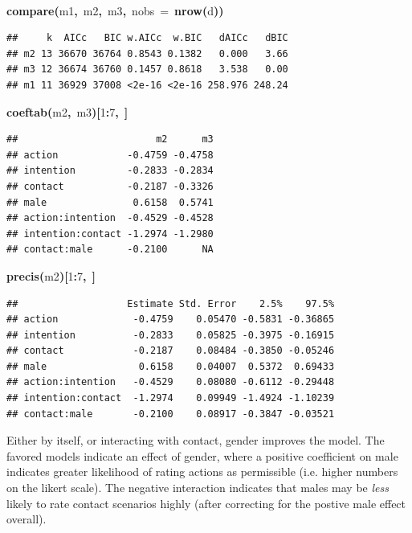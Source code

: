 \documentclass{article}
\makeatletter
\newcommand{\hlnumber}[1]{\textcolor[rgb]{0,0,0}{#1}}%
\newcommand{\hlfunctioncall}[1]{\textcolor[rgb]{.5,0,.33}{\textbf{#1}}}%
\newcommand{\hlkeyword}[1]{\textbf{#1}}%
\newcommand{\hlargument}[1]{\textcolor[rgb]{.69,.25,.02}{#1}}%
\newcommand{\hlsymbol}[1]{#1}%
\newcommand{\hlstd}[1]{\textcolor[rgb]{0,0,0}{#1}}%
\newenvironment{kframe}{%
 \def\FrameCommand##1{\hskip\@totalleftmargin \hskip-\fboxsep
 \colorbox{shadecolor}{##1}\hskip-\fboxsep
     \hskip-\linewidth \hskip-\@totalleftmargin \hskip\columnwidth}%
 \MakeFramed {\advance\hsize-\width
   \@totalleftmargin\z@ \linewidth\hsize
   \@setminipage}}%
 {\par\unskip\endMakeFramed}
\newenvironment{knitrout}{}{} %
\makeatother
\begin{document}
\begin{knitrout}
{\begin{kframe}
\begin{flushleft}
\hlstd{}\hspace*{\fill}\\
\hlstd{}\hlfunctioncall{compare}\hlkeyword{(}\hlsymbol{m1}\hlkeyword{,}{\ }\hlsymbol{m2}\hlkeyword{,}{\ }\hlsymbol{m3}\hlkeyword{,}{\ }\hlargument{nobs}{\ }\hlargument{=}{\ }\hlfunctioncall{nrow}\hlkeyword{(}\hlsymbol{d}\hlkeyword{)}\hlkeyword{)}\mbox{}
\normalfont
\end{flushleft}
\begin{verbatim}
##     k  AICc   BIC w.AICc  w.BIC   dAICc   dBIC
## m2 13 36670 36764 0.8543 0.1382   0.000   3.66
## m3 12 36674 36760 0.1457 0.8618   3.538   0.00
## m1 11 36929 37008 <2e-16 <2e-16 258.976 248.24
\end{verbatim}
\begin{flushleft}
\ttfamily\noindent
\hlfunctioncall{coeftab}\hlkeyword{(}\hlsymbol{m2}\hlkeyword{,}{\ }\hlsymbol{m3}\hlkeyword{)}\hlkeyword{[}\hlnumber{1}\hlkeyword{:}\hlnumber{7}\hlkeyword{,}{\ }\hlkeyword{]}\mbox{}
\normalfont
\end{flushleft}
\begin{verbatim}
##                        m2      m3
## action            -0.4759 -0.4758
## intention         -0.2833 -0.2834
## contact           -0.2187 -0.3326
## male               0.6158  0.5741
## action:intention  -0.4529 -0.4528
## intention:contact -1.2974 -1.2980
## contact:male      -0.2100      NA
\end{verbatim}
\begin{flushleft}
\ttfamily\noindent
\hlfunctioncall{precis}\hlkeyword{(}\hlsymbol{m2}\hlkeyword{)}\hlkeyword{[}\hlnumber{1}\hlkeyword{:}\hlnumber{7}\hlkeyword{,}{\ }\hlkeyword{]}\mbox{}
\normalfont
\end{flushleft}
\begin{verbatim}
##                   Estimate Std. Error    2.5%    97.5%
## action             -0.4759    0.05470 -0.5831 -0.36865
## intention          -0.2833    0.05825 -0.3975 -0.16915
## contact            -0.2187    0.08484 -0.3850 -0.05246
## male                0.6158    0.04007  0.5372  0.69433
## action:intention   -0.4529    0.08080 -0.6112 -0.29448
## intention:contact  -1.2974    0.09949 -1.4924 -1.10239
## contact:male       -0.2100    0.08917 -0.3847 -0.03521
\end{verbatim}
\end{kframe}}
\end{knitrout}



Either by itself, or interacting with contact, gender improves the model. 
The favored models indicate an effect of gender, where a positive coefficient on male indicates greater likelihood of rating actions as permissible (i.e. higher numbers on the likert scale).
The negative interaction indicates that males may be {\em less} likely to rate contact scenarios highly (after correcting for the postive male effect overall).
\end{document}

